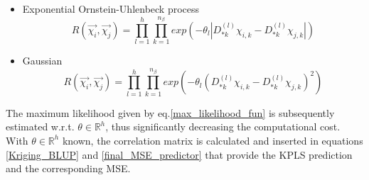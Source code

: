 \begin{itemize}
\item Exponential Ornstein-Uhlenbeck process
\begin{equation}
R \left( \vec{χ_{i}}, \vec{χ_{j}} \right) = 
\prod_{l=1}^{h} \prod_{k=1}^{n_{β}} exp \left( -\theta_{l} 
\left| D_{*k}^{(l)}χ_{i,k} - D_{*k}^{(l)} χ_{j,k} \right| 
\right)
\end{equation}              

\item Gaussian
\begin{equation}\label{KPLS_Gaussian}
R \left( \vec{χ_{i}}, \vec{χ_{j}} \right)  = 
\prod_{l=1}^{h} \prod_{k=1}^{n_{β}} exp \left(-\theta_{l} 
\left( D_{*k}^{(l)} χ_{i,k} - D_{*k}^{(l)} χ_{j,k} 
\right)^2  \right)
\end{equation} 
\end{itemize}

The maximum likelihood given by eq.\ref{max_likelihood_fun} is 
subsequently estimated w.r.t. $θ \!\in \!\mathbb{R}^{h}$, thus 
significantly decreasing the computational cost. With $θ \!\in 
\!\mathbb{R}^{h}$ known, the correlation matrix is calculated and 
inserted in equations \ref{Kriging_BLUP} and 
\ref{final_MSE_predictor} that provide the KPLS prediction and the 
corresponding MSE.
\newpage


